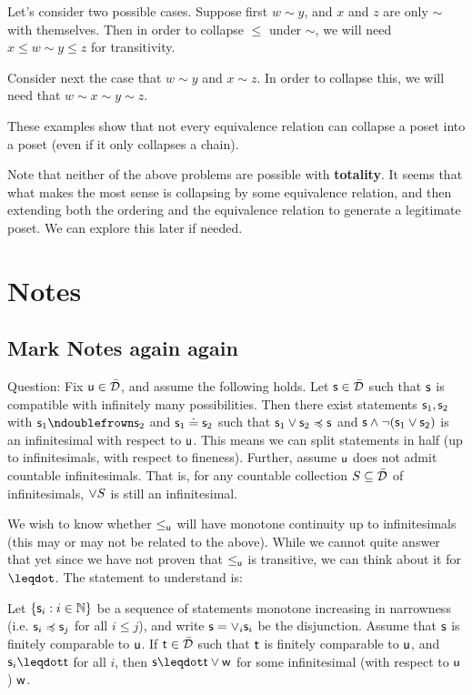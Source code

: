 \documentclass[10pt, onecolumn, nofootinbib]{revtex4-1}
\begin{document}
Let's consider two possible cases. Suppose first $w\sim y$, and $x$ and $z$ are only $\sim$ with themselves. Then in order to collapse $\leq$ under $\sim$, we will need $x \leq w\sim y \leq z$ for transitivity. 

Consider next the case that $w\sim y$ and $x\sim z$. In order to collapse this, we will need that $w\sim x\sim y \sim z$.

These examples show that not every equivalence relation can collapse a poset into a poset (even if it only collapses a chain). 

Note that neither of the above problems are possible with {\bf totality}. It seems that what makes the most sense is collapsing by some equivalence relation, and then extending both the ordering and the equivalence relation to generate a legitimate poset. We can explore this later if needed. 

\section{Notes}

\subsection{Mark Notes again again}

Question: Fix $\stmt[u]\in\tdomain$, and assume the following holds. Let $\stmt\in\tdomain$ such that $\stmt$ is compatible with infinitely many possibilities. Then there exist statements $\stmt_1,\stmt_2$ with $\stmt_1\ncomp\stmt_2$ and $\stmt_1\eqgran\stmt_2$ such that $\stmt_1\OR\stmt_2\narrower\stmt$ and $\stmt\AND\NOT(\stmt_1\OR\stmt_2)$ is an infinitesimal with respect to $\stmt[u]$. This means we can split statements in half (up to infinitesimals, with respect to fineness). 
Further, assume $\stmt[u]$ does not admit countable infinitesimals. That is, for any countable collection $S\subseteq\tdomain$ of infinitesimals, $\OR S$ is still an infinitesimal. 

We wish to know whether $\leq_{\stmt[u]}$ will have monotone continuity up to infinitesimals (this may or may not be related to the above). While we cannot quite answer that yet since we have not proven that $\lequ$ is transitive, we can think about it for $\finer$. The statement to understand is: 

Let $\{\stmt_i:i\in\mathbb{N}\}$ be a sequence of statements monotone increasing in narrowness (i.e. $\stmt_i\narrower\stmt_j$ for all $i\leq j$), and write $\stmt=\OR_i\stmt_i$ be the disjunction. Assume that $\stmt$ is finitely comparable to $\stmt[u]$. If $\stmt[t]\in\tdomain$ such that $\stmt[t]$ is finitely comparable to $\stmt[u]$, and $\stmt_i\finer\stmt[t]$ for all $i$, then $\stmt\finer\stmt[t]\OR\stmt[w]$ for some infinitesimal (with respect to $\stmt[u]$) $\stmt[w]$. 
\end{document}
